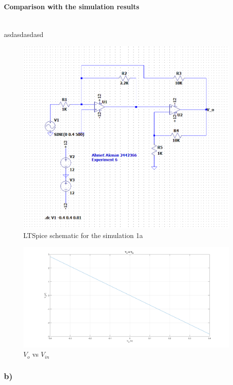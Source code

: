 \documentclass[letterpaper,12pt]{article}
\begin{document}
\paragraph{Comparison with the simulation results}
 \mbox{}
\\
asdasdasdasd
\begin{figure}[H]
	\centering
   \includegraphics[width=1\textwidth]{Pre1.png}
   \caption{LTSpice schematic for the simulation 1a }
\end{figure}

\begin{figure}[H]
	\centering
   \includegraphics[width=1\textwidth]{Pre_1a.png}
   \caption{\(V_{o}\) vs \(V_{in}\)}
\end{figure}



\subsubsection{b)}
\end{document}
